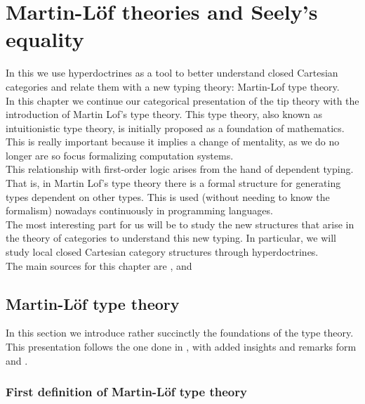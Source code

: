 
\chapter{Martin-L\"of theories and Seely's equality}
\label{chap:5}
\thispagestyle{empty}

 In this we use hyperdoctrines as a tool to better understand closed Cartesian categories and relate them with a new typing theory: Martin-Lof type theory.\\

 In this chapter we continue our categorical presentation of the tip theory with the introduction of Martin Lof's type theory. This type theory, also known as intuitionistic type theory, is initially proposed as a foundation of mathematics. This is really important because it implies a change of mentality, as we do no longer are so focus formalizing computation systems. \\

This relationship with first-order logic arises from the hand of dependent typing. That is, in Martin Lof's type theory there is a formal structure for generating types dependent on other types. This is used (without needing to know the formalism) nowadays continuously in programming languages. \\

The most interesting part for us will be to study the new structures that arise in the theory of categories to understand this new typing. In particular, we will study local closed Cartesian category structures through hyperdoctrines. \\

The main sources for this chapter are  \cite{seely1984locally}, \cite{martinlof1973intuitionistic}  and \cite{mac2013categories}



\section{Martin-Löf type theory}

In this section we introduce rather succinctly the foundations of the type theory. This presentation follows the one done in \cite{seely1984locally}, with added insights and remarks form \cite{martinlof1973intuitionistic} and \cite{sep-type-theory-intuitionistic}.



\subsection{First definition of Martin-Löf type theory}

